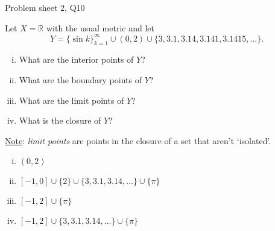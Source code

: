 \begin{problem}{Problem sheet 2, Q10}{}


    Let $X = \mathbb{R}$ with the usual metric and let
        $$ Y = \{\sin k\}_{k = 1}^\infty \cup (0, 2)
            \cup \{ 3, 3.1, 3.14, 3.141, 3.1415, \ldots \} . $$
    
    \begin{enumerate}[i)]
        \item What are the interior points of $Y$?
        \item What are the boundary points of $Y$?
        \item What are the limit points of $Y$?
        \item What is the closure of $Y$?
    \end{enumerate}

    \underline{Note}: \textit{limit points} are points in the closure of a set that aren't `isolated'.

    \tcblower

    \begin{enumerate}[i)]
        \item $(0, 2)$
        \item $[-1, 0] \cup \{2\} \cup \{ 3, 3.1, 3.14, \ldots \}
            \cup \{ \pi \}$
        \item $[-1, 2] \cup \{ \pi \}$
        \item $[-1, 2] \cup \{ 3, 3.1, 3.14, \ldots \}
            \cup \{ \pi \}$
    \end{enumerate}

\end{problem}


